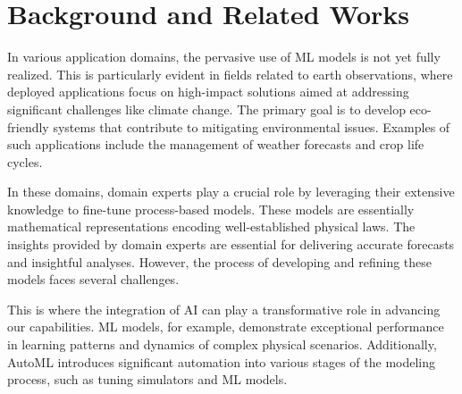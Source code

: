 \chapter{Background and Related Works}
\label{pluto-sec:background}
In various application domains, the pervasive use of ML models is not yet fully realized.
This is particularly evident in fields related to earth observations, where deployed applications focus on high-impact solutions aimed at addressing significant challenges like climate change. The primary goal is to develop eco-friendly systems that contribute to mitigating environmental issues. Examples of such applications include the management of weather forecasts and crop life cycles.

In these domains, domain experts play a crucial role by leveraging their extensive knowledge to fine-tune process-based models. These models are essentially mathematical representations encoding well-established physical laws. The insights provided by domain experts are essential for delivering accurate forecasts and insightful analyses. However, the process of developing and refining these models faces several challenges.



This is where the integration of AI can play a transformative role in advancing our capabilities.
ML models, for example, demonstrate exceptional performance in learning patterns and dynamics of complex physical scenarios.
Additionally, AutoML introduces significant automation into various stages of the modeling process, such as tuning simulators and ML models.

